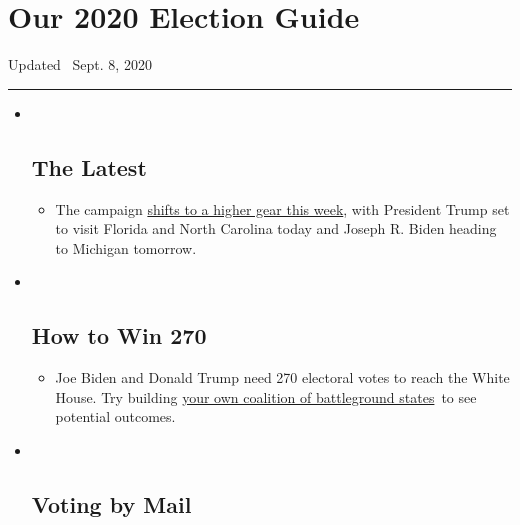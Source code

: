 \hypertarget{our-2020-election-guide}{%
\section{Our 2020 Election Guide}\label{our-2020-election-guide}}

Updated ~Sept. 8, 2020

\begin{center}\rule{0.5\linewidth}{\linethickness}\end{center}

\begin{itemize}
\item ~
  \hypertarget{the-latest}{%
  \subsection{The Latest}\label{the-latest}}

  \begin{itemize}
  \item
    The campaign
    \href{https://www.nytimes3xbfgragh.onion/live/2020/09/08/us/trump-vs-biden?action=click\&pgtype=Article\&state=default\&region=BELOW_MAIN_CONTENT\&context=storylines_guide}{shifts
    to a higher gear this week}, with President Trump set to visit
    Florida and North Carolina today and Joseph R. Biden heading to
    Michigan tomorrow.
  \end{itemize}
\item ~
  \hypertarget{how-to-win-270}{%
  \subsection{How to Win 270}\label{how-to-win-270}}

  \begin{itemize}
  \item
    Joe Biden and Donald Trump need 270 electoral votes to reach the
    White House. Try building
    \href{https://www.nytimes3xbfgragh.onion/interactive/2020/us/elections/election-states-biden-trump.html?action=click\&pgtype=Article\&state=default\&region=BELOW_MAIN_CONTENT\&context=storylines_guide}{your
    own coalition of battleground states}~to see potential outcomes.
  \end{itemize}
\item ~
  \hypertarget{voting-by-mail}{%
  \subsection{Voting by Mail}\label{voting-by-mail}}


\end{itemize}
